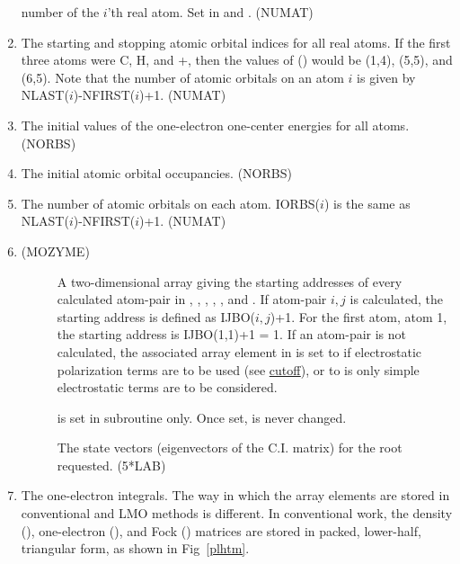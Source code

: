 \begin{enumerate}
number of the $i$'th real atom. Set in  and . (NUMAT)
\item {} The starting and stopping atomic orbital indices
for all real atoms.  If the first three atoms were C, H, and +, then the values
of () would be (1,4), (5,5), and (6,5).  Note that the
number of atomic orbitals on an atom $i$ is given by  NLAST($i$)-NFIRST($i$)+1.
(NUMAT)
\item {} The initial values of the one-electron one-center energies
for all atoms.  (NORBS)
\item {} The initial atomic orbital occupancies.  (NORBS)
\item {} The number of atomic orbitals on each atom. IORBS($i$) is
the same as NLAST($i$)-NFIRST($i$)+1. (NUMAT)
\item 
\begin{description}
\item[(MOZYME) ] A two-dimensional array giving the starting 
addresses of every calculated atom-pair in , , ,
, , and  . If atom-pair $i,j$ is
calculated, the starting address is defined as  IJBO($i,j$)+1.  For the first
atom, atom 1, the starting address is IJBO(1,1)+1 = 1. If an atom-pair is not
calculated, the associated array element in  is set to  if
electrostatic polarization terms are to be used (see \hyperref{\comp{CUTOF2} and
\comp{CUTOF1}}{, p.~}{}{cutoff}), or to  is only simple
electrostatic terms are to be considered.

 is set in subroutine  only.  Once set,  is
never changed.
\item[] The state vectors (eigenvectors of the C.I. matrix) for
the root requested. (5*LAB)
\end{description}

\item {} The one-electron integrals.   The way
in which the array elements are stored in conventional and LMO methods is
different.  In conventional work, the density (), one-electron
(), and Fock () matrices are stored in packed, lower-half,
triangular form, as shown in Fig~\ref{plhtm}.
\begin{figure}
\begin{makeimage}
\end{makeimage}
\begin{verbatim}
       

\end{verbatim}
\end{figure}
\end{enumerate}
